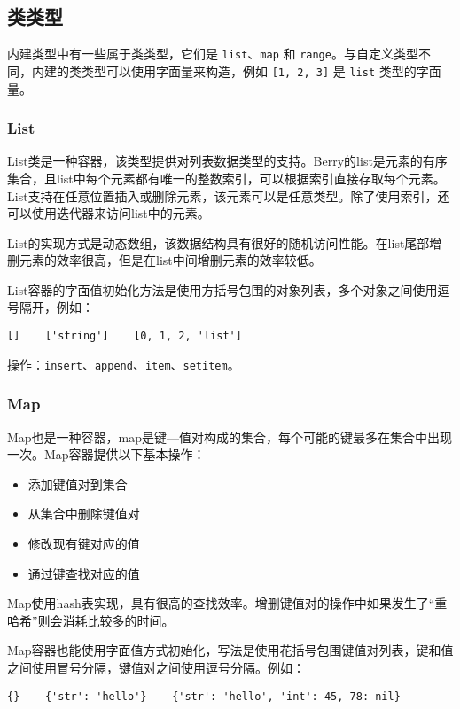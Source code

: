 \subsection{类类型}

内建类型中有一些属于类类型，它们是 \texttt{list}、\texttt{map} 和 \texttt{range}。与自定义类型不同，内建的类类型可以使用字面量来构造，例如 \texttt{[1, 2, 3]} 是 \texttt{list} 类型的字面量。

\subsubsection{List}

List类是一种容器，该类型提供对列表数据类型的支持。Berry的list是元素的有序集合，且list中每个元素都有唯一的整数索引，可以根据索引直接存取每个元素。List支持在任意位置插入或删除元素，该元素可以是任意类型。除了使用索引，还可以使用迭代器来访问list中的元素。

List的实现方式是动态数组，该数据结构具有很好的随机访问性能。在list尾部增删元素的效率很高，但是在list中间增删元素的效率较低。

List容器的字面值初始化方法是使用方括号包围的对象列表，多个对象之间使用逗号隔开，例如：
\begin{lstlisting}[language=berry, numbers=none]
[]    ['string']    [0, 1, 2, 'list']
\end{lstlisting}

操作：\texttt{insert}、\texttt{append}、\texttt{item}、\texttt{setitem}。

\subsubsection{Map}

Map也是一种容器，map是键—值对构成的集合，每个可能的键最多在集合中出现一次。Map容器提供以下基本操作：
\begin{itemize}
    \item 添加键值对到集合
    \item 从集合中删除键值对
    \item 修改现有键对应的值
    \item 通过键查找对应的值
\end{itemize}

Map使用hash表实现，具有很高的查找效率。增删键值对的操作中如果发生了``重哈希''则会消耗比较多的时间。

Map容器也能使用字面值方式初始化，写法是使用花括号包围键值对列表，键和值之间使用冒号分隔，键值对之间使用逗号分隔。例如：
\begin{lstlisting}[language=berry, numbers=none]
{}    {'str': 'hello'}    {'str': 'hello', 'int': 45, 78: nil}
\end{lstlisting}

